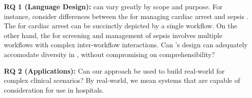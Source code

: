 \textbf{RQ 1 (Language Design):}  \BPGs{} can vary greatly by scope and purpose.
For instance,
consider differences between the \BPGs{} for managing cardiac
arrest \cite{acls-url} and sepsis \cite{RhodesICM17}. The \BPG{} for cardiac arrest can be
succinctly depicted by a single workflow. On the other hand, the \BPG{} for
screening and management of sepsis involves multiple workflows with complex
inter-workflow interactions. Can \MediK{}'s
design can adequately accomodate diversity in \BPGs{}, without
compromising on comprehensibility?

\textbf{RQ 2 (Applications):} Can our approach be used to build real-world
\CDSSs{} for complex clinical scenarios? By real-world, we mean systems that are capable of consideration
for use in hospitals.
%

